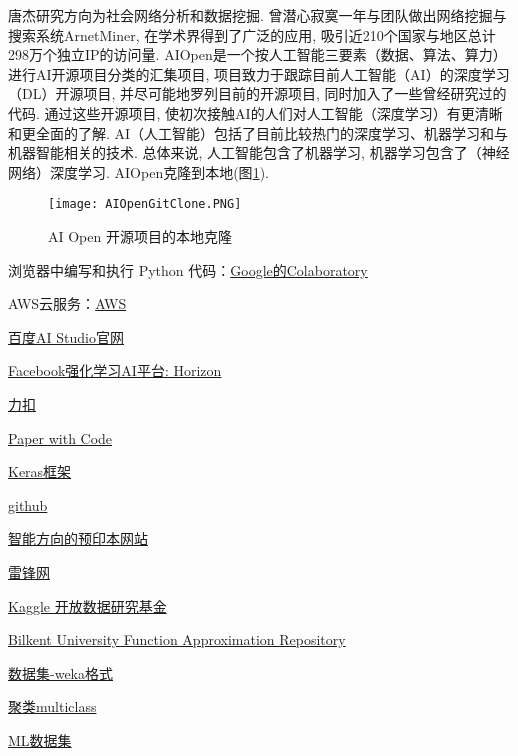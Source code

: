 \begin{remark}
唐杰研究方向为社会网络分析和数据挖掘. 曾潜心寂寞一年与团队做出网络挖掘与搜索系统ArnetMiner, 在学术界得到了广泛的应用, 吸引近210个国家与地区总计298万个独立IP的访问量.
AIOpen是一个按人工智能三要素（数据、算法、算力）进行AI开源项目分类的汇集项目, 项目致力于跟踪目前人工智能（AI）的深度学习（DL）开源项目, 并尽可能地罗列目前的开源项目, 同时加入了一些曾经研究过的代码.
通过这些开源项目, 使初次接触AI的人们对人工智能（深度学习）有更清晰和更全面的了解.
AI（人工智能）包括了目前比较热门的深度学习、机器学习和与机器智能相关的技术.
总体来说, 人工智能包含了机器学习, 机器学习包含了（神经网络）深度学习.
AIOpen克隆到本地(图\ref{AIOpenGitClone2020030801}).
\end{remark}
\begin{figure}[H]
\centering
\texttt{[image: AIOpenGitClone.PNG]}
\caption{AI Open 开源项目的本地克隆}
\label{AIOpenGitClone2020030801}
\end{figure}
浏览器中编写和执行 Python 代码：\href{https://colab.research.google.com/notebooks/intro.ipynb}{Google的Colaboratory}

AWS云服务：\href{https://aws.amazon.com/cn/}{AWS}

\href{http://aistudio.baidu.com/#/projectoverview}{百度AI Studio官网}

\href{https://github.com/openstack/horizon}{Facebook强化学习AI平台: Horizon}

\href{https://leetcode-cn.com/problemset/all/}{力扣}

\href{https://www.paperswithcode.com/}{Paper with Code}

\href{https://keras.io/zh/}{Keras框架}

\href{https://github.com/}{github}

\href{https://arxiv.org/}{智能方向的预印本网站}

\href{https://www.leiphone.com/category/ai}{雷锋网}

\href{https://www.kaggle.com/}{Kaggle 开放数据研究基金}

\href{http://funapp.cs.bilkent.edu.tr/DataSets/}{Bilkent University Function Approximation Repository}

\href{http://www.cs.waikato.ac.nz/ml/weka/datasets.html}{数据集-weka格式}

\href{http://www.csie.ntu.edu.tw/~cjlin/libsvmtools/datasets/multiclass.html}{聚类multiclass}

\href{http://archive.ics.uci.edu//ml/datasets}{ML数据集}

